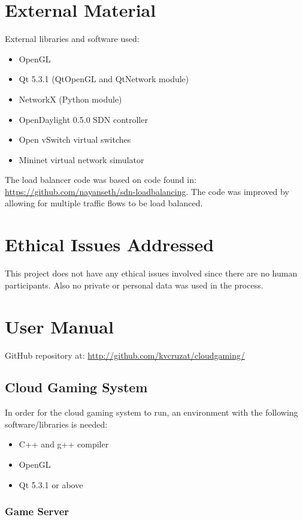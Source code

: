 \begin{appendices}
\chapter{External Material}
External libraries and software used:
\begin{itemize}
	\item OpenGL
	\item Qt 5.3.1 (QtOpenGL and QtNetwork module)
	\item NetworkX (Python module)
	\item OpenDaylight 0.5.0 SDN controller
	\item Open vSwitch virtual switches
	\item Mininet virtual network simulator
\end{itemize}

The load balancer code was based on code found in: \url{https://github.com/nayanseth/sdn-loadbalancing}. The code was improved by allowing for multiple traffic flows to be load balanced.

\chapter{Ethical Issues Addressed}
This project does not have any ethical issues involved since there are no human participants. Also no private or personal data was used in the process.

\chapter{User Manual}

GitHub repository at: \url{http://github.com/kvcruzat/cloudgaming/}

\section{Cloud Gaming System}

In order for the cloud gaming system to run, an environment with the following software/libraries is needed:
\begin{itemize}
	\item C++ and g++ compiler
	\item OpenGL
	\item Qt 5.3.1 or above
\end{itemize}

\subsection{Game Server}


\end{appendices}
